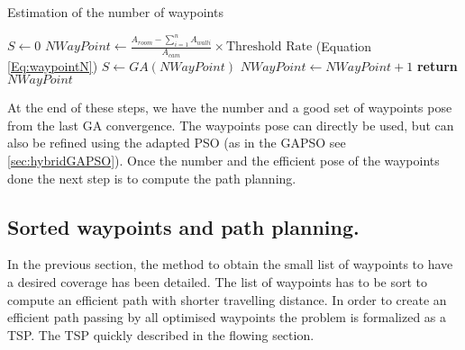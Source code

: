\begin{algorithm}{}
\caption{Estimation of the number of waypoints}\label{alg:euclid}
\begin{algorithmic}[6]
 \State $S\gets 0$
  \State $NWayPoint\gets \frac{ A_{room} - \sum_{i=1}^n A_{wall i} }{A_{cam}} \times \mbox{Threshold Rate} 
 $  (Equation \ref{Eq:waypointN})
	 \State $S \gets GA(NWayPoint)$
	  \State $NWayPoint\gets NWayPoint+1$
  \EndWhile\label{endwhile}
\State \textbf{return} $NWayPoint$
\EndProcedure
\end{algorithmic}
\end{algorithm}

At the end of these steps, we have the number and a good set of waypoints pose from the last GA convergence. The waypoints pose can directly be used, but can also be refined using the adapted PSO (as in the GAPSO see \ref{sec:hybridGAPSO}). Once the number and the efficient pose of the waypoints done the next step is to compute the path planning.  
	
 
  \subsection{Sorted waypoints and path planning.} \label{sorted}
In the previous section, the method to obtain the small list of waypoints to have a desired coverage has been detailed. The list of waypoints has to be sort to compute an efficient path with shorter travelling distance. In order to create an efficient path passing by all optimised waypoints the problem is formalized as a TSP. The TSP  quickly described in the flowing section.

 

